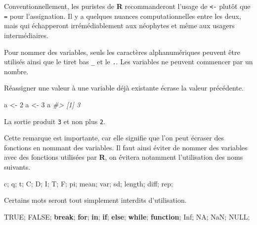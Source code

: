 \documentclass[
]{book}
\newenvironment{Shaded}{}{}
\newcommand{\CommentTok}[1]{\textit{#1}}
\newcommand{\ConstantTok}[1]{#1}
\newcommand{\ControlFlowTok}[1]{\textbf{#1}}
\newcommand{\DecValTok}[1]{#1}
\newcommand{\NormalTok}[1]{#1}
\newcommand{\OtherTok}[1]{#1}
\begin{document}
Conventionnellement, les puristes de \textbf{R} recommanderont l'usage de \texttt{\textless{}-} plutôt que \texttt{=} pour l'assignation. Il y a quelques nuances computationnelles entre les deux, mais qui échapperont irrémédiablement aux néophytes et même aux usagers intermédiaires.

Pour nommer des variables, seuls les caractères alphanumériques peuvent être utilisés ainsi que le tiret bas \texttt{\_} et le \texttt{.}. Les variables ne peuvent commencer par un nombre.

Réassigner une valeur à une variable déjà existante écrase la valeur précédente.

\begin{Shaded}
\begin{Highlighting}[]
\NormalTok{a }\OtherTok{\textless{}{-}} \DecValTok{2}
\NormalTok{a }\OtherTok{\textless{}{-}} \DecValTok{3}
\NormalTok{a}
\CommentTok{\#\textgreater{} [1] 3}
\end{Highlighting}
\end{Shaded}

La sortie produit \texttt{3} et non plus \texttt{2}.

Cette remarque est importante, car elle signifie que l'on peut écraser des fonctions en nommant des variables. Il faut ainsi éviter de nommer des variables avec des fonctions utilisées par \textbf{R}, on évitera notamment l'utilisation des noms suivants.

\begin{Shaded}
\begin{Highlighting}[]
\NormalTok{c; q; t; C; D; I; T; F; pi; mean; var; sd; length; diff; rep;}
\end{Highlighting}
\end{Shaded}

Certains mots seront tout simplement interdits d'utilisation.

\begin{Shaded}
\begin{Highlighting}[]
\ConstantTok{TRUE}\NormalTok{; }\ConstantTok{FALSE}\NormalTok{; }\ControlFlowTok{break}\NormalTok{; }\ControlFlowTok{for}\NormalTok{; }\ControlFlowTok{in}\NormalTok{; }\ControlFlowTok{if}\NormalTok{; }\ControlFlowTok{else}\NormalTok{; }\ControlFlowTok{while}\NormalTok{; }\ControlFlowTok{function}\NormalTok{; }\ConstantTok{Inf}\NormalTok{; }\ConstantTok{NA}\NormalTok{; }\ConstantTok{NaN}\NormalTok{; }\ConstantTok{NULL}\NormalTok{;}
\end{Highlighting}
\end{Shaded}
\end{document}
